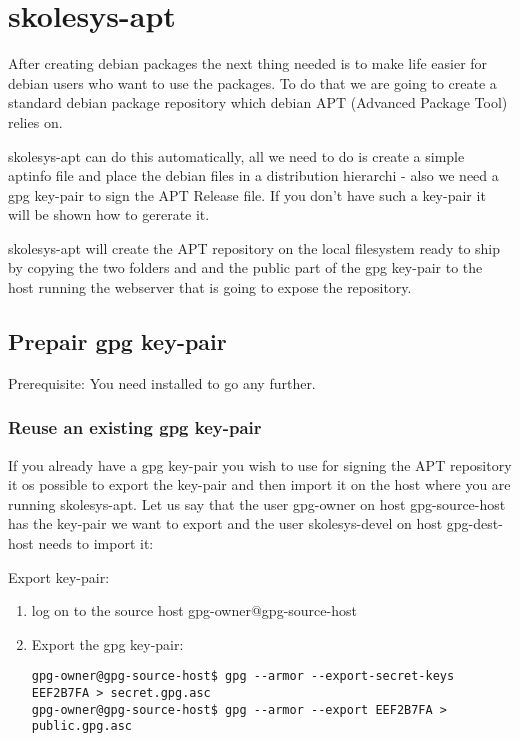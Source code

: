 \section{skolesys-apt\label{skolesys-apt}}
After creating debian packages the next thing needed is to make life easier for debian users who want to use the packages. To do that we are going to create a standard debian package repository which debian APT (Advanced Package Tool) relies on. 

skolesys-apt can do this automatically, all we need to do is create a simple aptinfo file and place the debian files in a distribution hierarchi - also we need a gpg key-pair to sign the APT Release file. If you don't have such a key-pair it will be shown how to gererate it.

skolesys-apt will create the APT repository on the local filesystem ready to ship by copying the two folders  and  and the public part of the gpg key-pair to the host running the webserver that is going to expose the repository.


\subsection{Prepair gpg key-pair\label{skolesys-apt-gpg}}

Prerequisite: You need  installed to go any further.

\subsubsection{Reuse an existing gpg key-pair\label{skolesys-apt-reusegpg}}
If you already have a gpg key-pair you wish to use for signing the APT repository it os possible to export the key-pair and then import it on the host where you are running skolesys-apt.
Let us say that the user gpg-owner on host gpg-source-host has the key-pair we want to export and the user skolesys-devel on host gpg-dest-host needs to import it:

Export key-pair:
\begin{enumerate}
 \item log on to the source host gpg-owner@gpg-source-host
 \item Export the gpg key-pair:
\begin{verbatim}
gpg-owner@gpg-source-host$ gpg --armor --export-secret-keys EEF2B7FA > secret.gpg.asc
gpg-owner@gpg-source-host$ gpg --armor --export EEF2B7FA > public.gpg.asc
\end{verbatim}
\end{enumerate}

